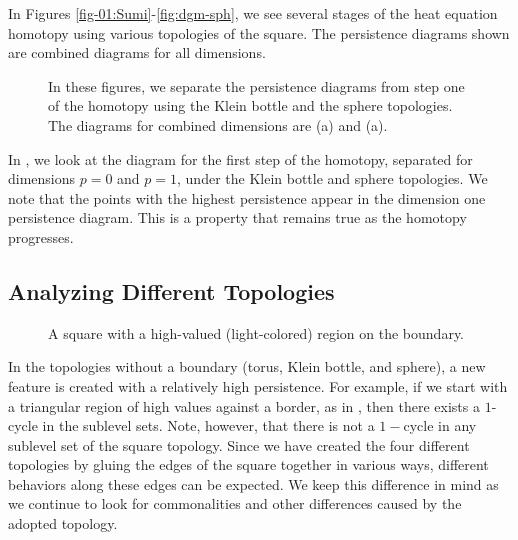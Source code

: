 In Figures \ref{fig-01:Sumi}-\ref{fig:dgm-sph}, we see several stages of the
heat equation homotopy using various topologies of the square.  The persistence 
diagrams shown are combined diagrams for all dimensions. 
\begin{figure}[hbt]
	\centering
 \caption{In these figures, we separate the persistence diagrams from step one of the homotopy
          using the Klein bottle and the sphere topologies.  The diagrams for combined dimensions are
          (a) and (a).}
 \label{fig:splitDimensions}
\end{figure}
In , we look at the diagram for the first step
of the homotopy, separated for dimensions $p=0$ and 
$p=1$, under the Klein bottle and sphere topologies.  We note that the points
with the highest persistence appear in the dimension one persistence diagram.
This is a property that remains true as the homotopy progresses.

\subsection{Analyzing Different Topologies}
\begin{figure}[ht]
 \vspace*{0.1in}
 \centering
 \centerline{}
 \caption[Triangle on Boundary]{
                 A square with a high-valued (light-colored)
                 region on the boundary.
                }\label{fig:tri-bdry}
\end{figure}
In the topologies without a boundary (torus, Klein bottle, and sphere), a new
feature is created with a relatively high persistence.  For example, if we 
start with a triangular region of high values against a border, as in 
, then there exists a $1$-cycle in the sublevel sets. 
Note, however, that there is not a $1-$cycle in any sublevel set of the square
topology.  Since we have created the four different topologies by gluing the 
edges of the square together in various ways, different behaviors along these
edges can be expected. We keep this difference in mind as we continue to look 
for commonalities and other differences caused by the adopted topology.

